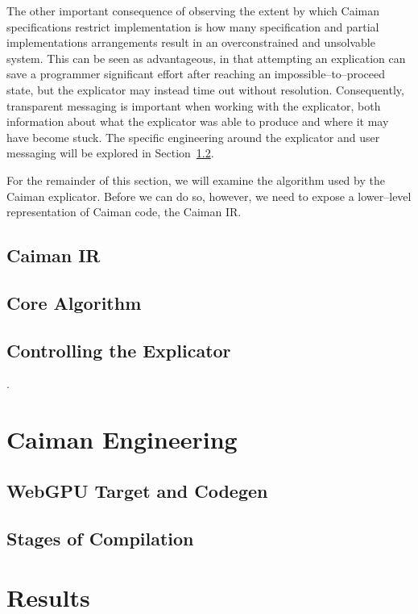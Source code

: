 The other important consequence of observing the extent by which Caiman specifications restrict implementation is how many specification and partial implementations arrangements result in an overconstrained and unsolvable system.  This can be seen as advantageous, in that attempting an explication can save a programmer significant effort after reaching an impossible--to--proceed state, but the explicator may instead time out without resolution.  Consequently, transparent messaging is important when working with the explicator, both information about what the explicator was able to produce and where it may have become stuck.  The specific engineering around the explicator and user messaging will be explored in Section~\ref{subsec:compilation}.

For the remainder of this section, we will examine the algorithm used by the Caiman explicator.  Before we can do so, however, we need to expose a lower--level representation of Caiman code, the Caiman IR.

\subsection{Caiman IR}
\label{subsec:ir}



\subsection{Core Algorithm}

\subsection{Controlling the Explicator}
\label{subsec:control}.

\section{Caiman Engineering}
\label{sec:engineering}

\subsection{WebGPU Target and Codegen}

\subsection{Stages of Compilation}
\label{subsec:compilation}

\section{Results}
\label{sec:results}

